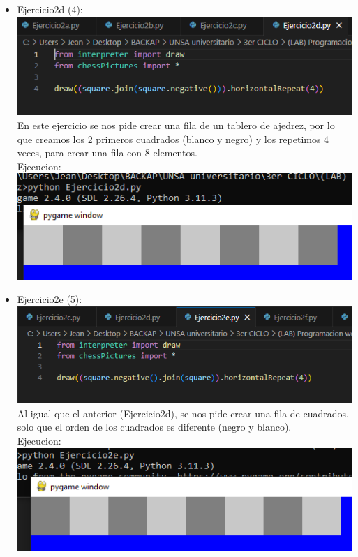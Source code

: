 \documentclass[]{article}
\begin{document}
\begin{itemize}
            \item Ejercicio2d (4): \\
            \includegraphics[]{../img/img10.png}\\
            En este ejercicio se nos pide crear una fila de un tablero de ajedrez, por lo que creamos los 2
            primeros cuadrados (blanco y negro) y los repetimos 4 veces, para crear una fila con 8 elementos. \\
            Ejecucion:\\
            \includegraphics[]{../img/img11.png}\\

            \item Ejercicio2e (5): \\
            \includegraphics[]{../img/img12.png}\\
            Al igual que el anterior (Ejercicio2d), se nos pide crear una fila de cuadrados, solo que el orden de los cuadrados es diferente (negro y blanco). \\
            Ejecucion:\\
            \includegraphics[]{../img/img13.png}\\


\end{itemize}
\end{document}
